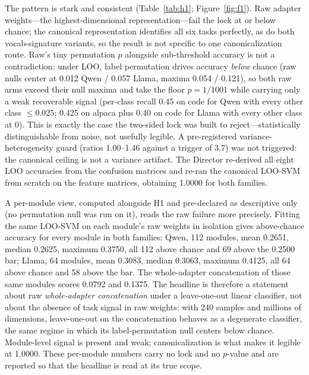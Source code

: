 \documentclass{article}
\begin{document}
The pattern is stark and consistent (Table~\ref{tab:h1};
Figure~\ref{fig:f1}). Raw adapter
weights---the highest-dimensional representation---fail the lock at or
below chance; the canonical representation identifies all six tasks
perfectly, as do both vocab-signature variants, so the result is not
specific to one canonicalization route. Raw's tiny permutation $p$
alongside sub-threshold accuracy is not a contradiction: under LOO, label
permutation drives accuracy \emph{below} chance (raw nulls center at 0.012
Qwen / 0.057 Llama, maxima 0.054 / 0.121), so both raw arms exceed their
null maxima and take the floor $p = 1/1001$ while carrying only a weak
recoverable signal (per-class recall 0.45 on code for Qwen with every other
class $\le 0.025$; 0.425 on alpaca plus 0.40 on code for Llama with every
other class at 0). This is exactly the case the two-sided lock was built to
reject---statistically distinguishable from noise, not usefully legible. A
pre-registered variance-heterogeneity guard (ratios 1.00--1.46 against a
trigger of 3.7) was not triggered: the canonical ceiling is not a variance
artifact. The Director re-derived all eight LOO accuracies from the
confusion matrices and re-ran the canonical LOO-SVM from scratch on the
feature matrices, obtaining 1.0000 for both families.

A per-module view, computed alongside H1 and pre-declared as descriptive
only (no permutation null was run on it), reads the raw failure more
precisely. Fitting the same LOO-SVM on each module's raw weights in
isolation gives above-chance accuracy for every module in both families:
Qwen, 112 modules, mean 0.2651, median 0.2625, maximum 0.3750, all 112
above chance and 69 above the 0.2500 bar; Llama, 64 modules, mean 0.3083,
median 0.3063, maximum 0.4125, all 64 above chance and 58 above the bar.
The whole-adapter concatenation of those same modules scores 0.0792 and
0.1375. The headline is therefore a statement about raw
\emph{whole-adapter concatenation} under a leave-one-out linear
classifier, not about the absence of task signal in raw weights: with 240
samples and millions of dimensions, leave-one-out on the concatenation
behaves as a degenerate classifier, the same regime in which its
label-permutation null centers below chance. Module-level signal is
present and weak; canonicalization is what makes it legible at 1.0000.
These per-module numbers carry no lock and no $p$-value and are reported
so that the headline is read at its true scope.
\end{document}
